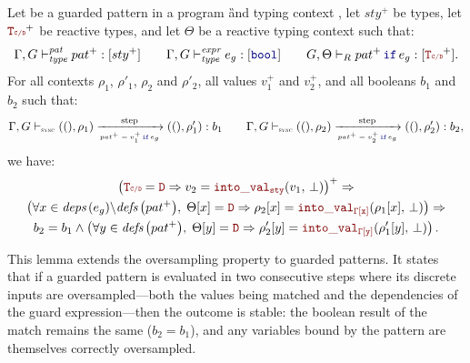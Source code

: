 \begin{lemma}
    \label{lem:semantics:grsync:theorems:oversampling:pat}
    Let  be a guarded pattern in a program \G and typing context \tyCtx, let
    $sty^+$ be types, let $\rType^+$ be reactive types, and let $\Theta$ be a reactive typing
    context such that:
    \begin{equation*}
        \patTyped{pat^+}{sty^+} \qquad \exprTyped{e_g}{\kwf{bool}} \qquad \patTypedReact{\Theta}{\guarded{pat^+}{e_g}}{\rType^+}.
    \end{equation*}
    For all contexts $\rho_1$, $\rho'_1$, $\rho_2$ and $\rho'_2$, all values $v_1^+$ and $v_2^+$,
    and all booleans $b_1$ and $b_2$ such that:
    \begin{equation*}
        \patOpsem{\rho_1}{\guarded{pat^+ = v_1^+}{e_g}}{b_1}{\rho'_1} \qquad
        \patOpsem{\rho_2}{\guarded{pat^+ = v_2^+}{e_g}}{b_2}{\rho'_2},
    \end{equation*}
    we have:
    \begin{multline*}
        \left(\rType = \dType \Rightarrow v_2 = \intoVal{sty}{v_1}{\bot}\right)^+ \Rightarrow \\
        \left(\forall x \in \deps{e_g} \backslash \defs{pat^+}, \; \Theta[x] = \dType \Rightarrow \rho_2[x] = \intoVal{\tyCtx[x]}{\rho_1[x]}{\bot}\right) \Rightarrow \\
        b_2 = b_1 \wedge \left(\forall y \in \defs{pat^+}, \; \Theta[y] = \dType \Rightarrow \rho'_2[y] = \intoVal{\tyCtx[y]}{\rho'_1[y]}{\bot}\right).
    \end{multline*}

    This lemma extends the oversampling property to guarded patterns. It states that if a
    guarded pattern is evaluated in two consecutive steps where its discrete inputs are
    oversampled---both the values being matched and the dependencies of the guard
    expression---then the outcome is stable: the boolean result of the match remains the
    same ($b_2 = b_1$), and any variables bound by the pattern are themselves correctly
    oversampled.
\end{lemma}
